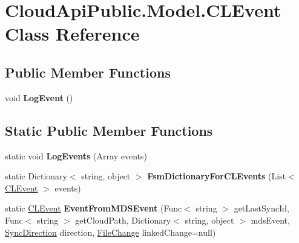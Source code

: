 \hypertarget{class_cloud_api_public_1_1_model_1_1_c_l_event}{\section{Cloud\-Api\-Public.\-Model.\-C\-L\-Event Class Reference}
\label{class_cloud_api_public_1_1_model_1_1_c_l_event}
}
\subsection*{Public Member Functions}
\begin{DoxyCompactItemize}
\item 
\hypertarget{class_cloud_api_public_1_1_model_1_1_c_l_event_a2d23ef6073f7799cdaad248f0910d14f}{void {\bfseries Log\-Event} ()}\label{class_cloud_api_public_1_1_model_1_1_c_l_event_a2d23ef6073f7799cdaad248f0910d14f}

\end{DoxyCompactItemize}
\subsection*{Static Public Member Functions}
\begin{DoxyCompactItemize}
\item 
\hypertarget{class_cloud_api_public_1_1_model_1_1_c_l_event_a6b4ace992328b345254175174cdb8b50}{static void {\bfseries Log\-Events} (Array events)}\label{class_cloud_api_public_1_1_model_1_1_c_l_event_a6b4ace992328b345254175174cdb8b50}

\item 
\hypertarget{class_cloud_api_public_1_1_model_1_1_c_l_event_a9921b4a743b70fed9d44a6dde7b69afa}{static Dictionary$<$ string, object $>$ {\bfseries Fsm\-Dictionary\-For\-C\-L\-Events} (List$<$ \hyperlink{class_cloud_api_public_1_1_model_1_1_c_l_event}{C\-L\-Event} $>$ events)}\label{class_cloud_api_public_1_1_model_1_1_c_l_event_a9921b4a743b70fed9d44a6dde7b69afa}

\item 
\hypertarget{class_cloud_api_public_1_1_model_1_1_c_l_event_add11d07cbbce5a22aa1f264d162c7bca}{static \hyperlink{class_cloud_api_public_1_1_model_1_1_c_l_event}{C\-L\-Event} {\bfseries Event\-From\-M\-D\-S\-Event} (Func$<$ string $>$ get\-Last\-Sync\-Id, Func$<$ string $>$ get\-Cloud\-Path, Dictionary$<$ string, object $>$ mds\-Event, \hyperlink{namespace_cloud_api_public_1_1_static_a8ba5d1f6d06fa058730616f021c8974f}{Sync\-Direction} direction, \hyperlink{class_cloud_api_public_1_1_model_1_1_file_change}{File\-Change} linked\-Change=null)}\label{class_cloud_api_public_1_1_model_1_1_c_l_event_add11d07cbbce5a22aa1f264d162c7bca}

\end{DoxyCompactItemize}
